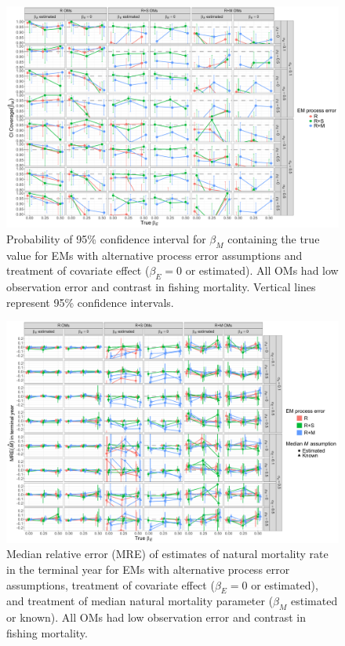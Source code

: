 \documentclass[
  12pt,
]{article}
\begin{document}
\begin{landscape}
\begin{figure}
\begin{center}
\includegraphics[height = \textheight]{beta_M_CI_coverage_main}
\end{center}
\caption{Probability of 95\% confidence interval for $\beta_M$ containing the true value for EMs with alternative process error assumptions and treatment of covariate effect ($\beta_E = 0$ or estimated). All OMs had low observation error and contrast in fishing mortality. Vertical lines represent 95\% confidence intervals.}\label{beta_M_CI_coverage}
\end{figure}
\end{landscape}

\begin{landscape}
\begin{figure}
\begin{center}
\includegraphics[height = \textheight]{terminal_year_M_bias_main}
\end{center}
\caption{Median relative error (MRE) of estimates of natural mortality rate in the terminal year for EMs with alternative process error assumptions, treatment of covariate effect ($\beta_E = 0$ or estimated), and treatment of median natural mortality parameter ($\beta_M$ estimated or known).  All OMs had low observation error and contrast in fishing mortality.}\label{terminal_M_bias}
\end{figure}
\end{landscape}
\end{document}
